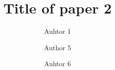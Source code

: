 \documentclass{standalone}
\begin{document}
\author{
  Auhtor 1
  \and
  Author 5
  \and
  Auhtor 6}
\title{Title of paper 2}

\maketitle

\label{pap:paper2}
\begin{abstract}
\lipsum[6-7]
\end{abstract}

\lipsum[6-7]


\printbibliography[segment=\therefsegment,heading=subbibliography]
\end{document}
